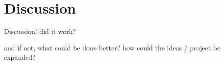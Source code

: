 \chapter{Discussion}\label{sec:discussion}
Discussion! did it work?

and if not, what could be done better? how could the ideas / project be expanded?



